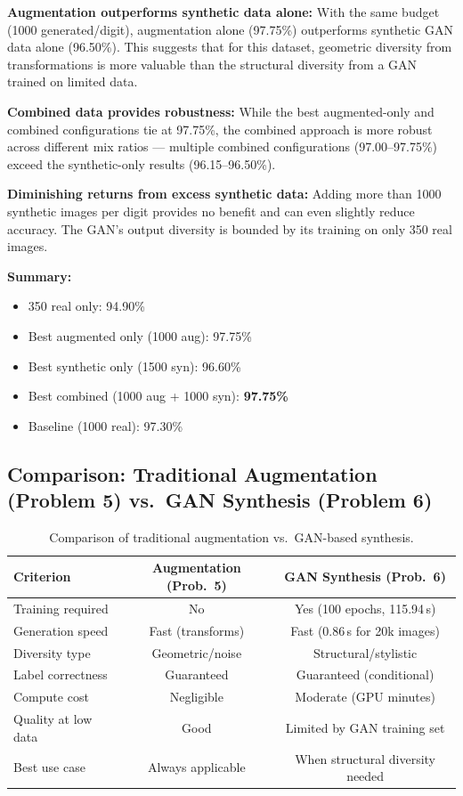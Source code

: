 \documentclass[12pt, a4paper]{article}
\renewcommand{\arraystretch}{1.12}
\begin{document}
\textbf{Augmentation outperforms synthetic data alone:}
With the same budget (1000 generated/digit), augmentation alone (97.75\%) outperforms
synthetic GAN data alone (96.50\%). This suggests that for this dataset, geometric
diversity from transformations is more valuable than the structural diversity from a
GAN trained on limited data.

\textbf{Combined data provides robustness:}
While the best augmented-only and combined configurations tie at 97.75\%, the combined
approach is more robust across different mix ratios --- multiple combined configurations
(97.00--97.75\%) exceed the synthetic-only results (96.15--96.50\%).

\textbf{Diminishing returns from excess synthetic data:}
Adding more than 1000 synthetic images per digit provides no benefit and can even
slightly reduce accuracy. The GAN's output diversity is bounded by its training on
only 350 real images.

\textbf{Summary:}
\begin{itemize}
    \item 350 real only: 94.90\%
    \item Best augmented only (1000 aug): 97.75\%
    \item Best synthetic only (1500 syn): 96.60\%
    \item Best combined (1000 aug + 1000 syn): \textbf{97.75\%}
    \item Baseline (1000 real): 97.30\%
\end{itemize}

\subsection{Comparison: Traditional Augmentation (Problem 5) vs.\ GAN Synthesis (Problem 6)}

\begin{table}[H]
\centering
\renewcommand{\arraystretch}{1.3}
\begin{tabular}{l c c}
\toprule
\textbf{Criterion} & \textbf{Augmentation (Prob.~5)} & \textbf{GAN Synthesis (Prob.~6)} \\
\midrule
Training required       & No                & Yes (100 epochs, 115.94\,s) \\
Generation speed        & Fast (transforms) & Fast (0.86\,s for 20k images) \\
Diversity type          & Geometric/noise   & Structural/stylistic \\
Label correctness       & Guaranteed        & Guaranteed (conditional) \\
Compute cost            & Negligible        & Moderate (GPU minutes) \\
Quality at low data     & Good              & Limited by GAN training set \\
Best use case           & Always applicable & When structural diversity needed \\
\bottomrule
\end{tabular}
\caption{Comparison of traditional augmentation vs.\ GAN-based synthesis.}
\label{tab:prob6_comparison}
\end{table}
\end{document}
